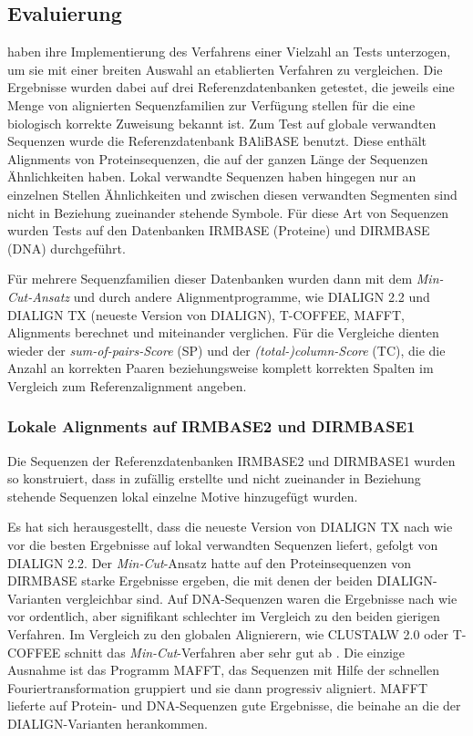 \subsection{Evaluierung}

\cite{cpm10} haben ihre Implementierung des Verfahrens einer Vielzahl an Tests unterzogen, um sie mit einer breiten Auswahl an etablierten Verfahren zu vergleichen. Die Ergebnisse wurden dabei auf drei Referenzdatenbanken getestet, die jeweils eine Menge von alignierten Sequenzfamilien zur Verfügung stellen für die eine biologisch korrekte Zuweisung bekannt ist. Zum Test auf globale verwandten Sequenzen wurde die Referenzdatenbank BAliBASE benutzt. Diese enthält Alignments von Proteinsequenzen, die auf der ganzen Länge der Sequenzen Ähnlichkeiten haben. Lokal verwandte Sequenzen haben hingegen nur an einzelnen Stellen Ähnlichkeiten und zwischen diesen verwandten Segmenten sind nicht in Beziehung zueinander stehende Symbole. Für diese Art von Sequenzen wurden Tests auf den Datenbanken IRMBASE (Proteine) und DIRMBASE (DNA) durchgeführt.

Für mehrere Sequenzfamilien dieser Datenbanken wurden dann mit dem \emph{Min-Cut-Ansatz} und durch andere Alignmentprogramme, wie DIALIGN 2.2 und DIALIGN TX (neueste Version von DIALIGN), T-COFFEE, MAFFT, Alignments berechnet und miteinander verglichen. Für die Vergleiche dienten wieder der \emph{sum-of-pairs-Score} (SP) und der \emph{(total-)column-Score} (TC), die die Anzahl an korrekten Paaren beziehungsweise komplett korrekten Spalten im Vergleich zum Referenzalignment angeben.

\subsubsection{Lokale Alignments auf IRMBASE2 und DIRMBASE1}

Die Sequenzen der Referenzdatenbanken IRMBASE2 und DIRMBASE1 wurden so konstruiert, dass in zufällig erstellte und nicht zueinander in Beziehung stehende Sequenzen lokal einzelne Motive hinzugefügt wurden.

Es hat sich herausgestellt, dass die neueste Version von DIALIGN TX nach wie vor die besten Ergebnisse auf lokal verwandten Sequenzen liefert, gefolgt von DIALIGN 2.2. Der \emph{Min-Cut}-Ansatz hatte auf den Proteinsequenzen von DIRMBASE starke Ergebnisse ergeben, die mit denen der beiden DIALIGN-Varianten vergleichbar sind. Auf DNA-Sequenzen waren die Ergebnisse nach wie vor ordentlich, aber signifikant schlechter im Vergleich zu den beiden gierigen Verfahren. Im Vergleich zu den globalen Alignierern, wie CLUSTALW 2.0 oder T-COFFEE schnitt das \emph{Min-Cut}-Verfahren aber sehr gut ab \cite{cpm10}. Die einzige Ausnahme ist das Programm MAFFT, das Sequenzen mit Hilfe der schnellen Fouriertransformation gruppiert und sie dann progressiv aligniert. MAFFT lieferte auf Protein- und DNA-Sequenzen gute Ergebnisse, die beinahe an die der DIALIGN-Varianten herankommen.

